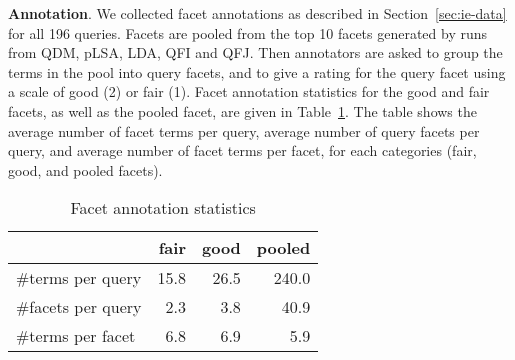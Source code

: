 \textbf{Annotation}. We collected facet annotations as described in Section~\ref{sec:ie-data} for all 196 queries. Facets are pooled from the top 10 facets generated by runs from QDM, pLSA, LDA, QFI and QFJ. Then annotators are asked to group the terms in the pool into query facets, and to give a rating for the query facet using a scale of good (2) or fair (1). Facet annotation statistics for the good and fair facets, as well as the pooled facet, are given in Table~\ref{tab:facet-annotations}. The table shows the average number of facet terms per query, average number of query facets per query, and average number of facet terms per facet, for each categories (fair, good, and pooled facets).

\begin{table}[!ht]
\centering
\caption{Facet annotation statistics}
\label{tab:facet-annotations}
\begin{tabular}{|l|r|r|r|} \hline
& fair & good & pooled\\ \hline
\#terms per query & 15.8 & 26.5 & 240.0\\ 
\#facets per query & 2.3 & 3.8 & 40.9 \\ 
\#terms per facet & 6.8 & 6.9 & 5.9 \\ \hline
\end{tabular}
\end{table}

